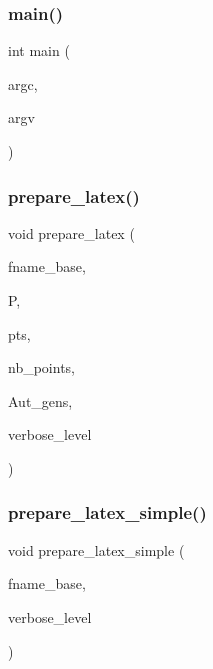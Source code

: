 \mbox{\label{conic_8_c_a3c04138a5bfe5d72780bb7e82a18e627}} 
\subsubsection{\texorpdfstring{main()}{main()}}
{\footnotesize\ttfamily int main (\begin{DoxyParamCaption}\item[{int}]{argc,  }\item[{char $\ast$$\ast$}]{argv }\end{DoxyParamCaption})}

\mbox{\label{conic_8_c_a311fd12053720514f81d00d08120f4ce}} 
\subsubsection{\texorpdfstring{prepare\+\_\+latex()}{prepare\_latex()}}
{\footnotesize\ttfamily void prepare\+\_\+latex (\begin{DoxyParamCaption}\item[{\mbox{\hyperlink{galois_8h_ab6cc7b4aeb6ea31aba2b3fbfc83ff5e6}{B\+Y\+TE}} $\ast$}]{fname\+\_\+base,  }\item[{\mbox{\hyperlink{classprojective__space}{projective\+\_\+space}} $\ast$}]{P,  }\item[{\mbox{\hyperlink{galois_8h_a09fddde158a3a20bd2dcadb609de11dc}{I\+NT}} $\ast$}]{pts,  }\item[{\mbox{\hyperlink{galois_8h_a09fddde158a3a20bd2dcadb609de11dc}{I\+NT}}}]{nb\+\_\+points,  }\item[{\mbox{\hyperlink{classstrong__generators}{strong\+\_\+generators}} $\ast$}]{Aut\+\_\+gens,  }\item[{\mbox{\hyperlink{galois_8h_a09fddde158a3a20bd2dcadb609de11dc}{I\+NT}}}]{verbose\+\_\+level }\end{DoxyParamCaption})}

\mbox{\label{conic_8_c_a528dbc3668d6d9107524c9970d685d16}} 
\subsubsection{\texorpdfstring{prepare\+\_\+latex\+\_\+simple()}{prepare\_latex\_simple()}}
{\footnotesize\ttfamily void prepare\+\_\+latex\+\_\+simple (\begin{DoxyParamCaption}\item[{\mbox{\hyperlink{galois_8h_ab6cc7b4aeb6ea31aba2b3fbfc83ff5e6}{B\+Y\+TE}} $\ast$}]{fname\+\_\+base,  }\item[{\mbox{\hyperlink{galois_8h_a09fddde158a3a20bd2dcadb609de11dc}{I\+NT}}}]{verbose\+\_\+level }\end{DoxyParamCaption})}



